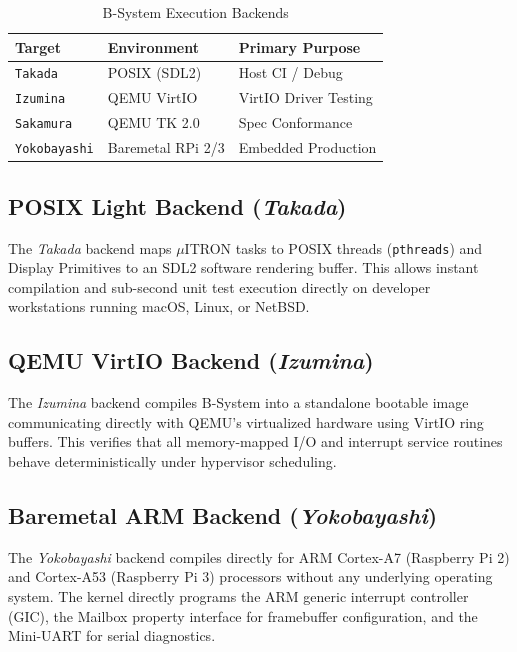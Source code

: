 \documentclass[10pt,journal,compsoc,twocolumn]{article}
\begin{document}
\begin{table}[htbp]
\caption{B-System Execution Backends}
\label{tab:backends}
\centering
\footnotesize
\begin{tabular}{@{}lll@{}}
\toprule
\textbf{Target} & \textbf{Environment} & \textbf{Primary Purpose} \\
\midrule
\texttt{Takada}      & POSIX (SDL2)         & Host CI / Debug \\
\texttt{Izumina}     & QEMU VirtIO          & VirtIO Driver Testing \\
\texttt{Sakamura}    & QEMU TK 2.0          & Spec Conformance \\
\texttt{Yokobayashi} & Baremetal RPi 2/3    & Embedded Production \\
\bottomrule
\end{tabular}
\end{table}

\subsection{POSIX Light Backend (\emph{Takada})}
The \emph{Takada} backend maps $\mu$ITRON tasks to POSIX threads (\texttt{pthreads}) and Display Primitives to an SDL2 software rendering buffer. This allows instant compilation and sub-second unit test execution directly on developer workstations running macOS, Linux, or NetBSD.

\subsection{QEMU VirtIO Backend (\emph{Izumina})}
The \emph{Izumina} backend compiles B-System into a standalone bootable image communicating directly with QEMU's virtualized hardware using VirtIO ring buffers. This verifies that all memory-mapped I/O and interrupt service routines behave deterministically under hypervisor scheduling.

\subsection{Baremetal ARM Backend (\emph{Yokobayashi})}
The \emph{Yokobayashi} backend compiles directly for ARM Cortex-A7 (Raspberry Pi 2) and Cortex-A53 (Raspberry Pi 3) processors without any underlying operating system. The kernel directly programs the ARM generic interrupt controller (GIC), the Mailbox property interface for framebuffer configuration, and the Mini-UART for serial diagnostics.

\end{document}
